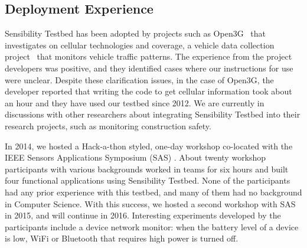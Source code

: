 
%
%

\subsection{Deployment Experience}\label{sec-deployment}



Sensibility Testbed has been adopted by projects such as 
Open3G~\cite{open3g} that investigates on cellular technologies 
and coverage, a vehicle data collection project~\cite{reininger2015first} 
that monitors vehicle traffic patterns. The experience from the 
project developers was positive, and they identified cases where our 
instructions for use were unclear. Despite these clarification issues, in 
the case of Open3G, the developer reported that writing the code to
get cellular information took about an hour and they have used our
testbed since 2012. We are currently in discussions with other 
researchers about integrating Sensibility Testbed into their research
projects, such as monitoring construction safety.

In 2014, we hosted a Hack-a-thon styled, one-day workshop co-located with 
the IEEE Sensors Applications Symposium (SAS) \cite{sas}. About twenty 
workshop participants with various backgrounds worked in teams 
for six hours and built four functional applications using Sensibility 
Testbed. None of the participants had any prior experience with 
this testbed, and many of them had no background in Computer
Science. With this success, we hosted a second workshop with 
SAS in 2015, and will continue in 2016. Interesting experiments 
developed by the participants include a device network monitor: 
when the battery level of a device is low, WiFi or Bluetooth that 
requires high power is turned off.

